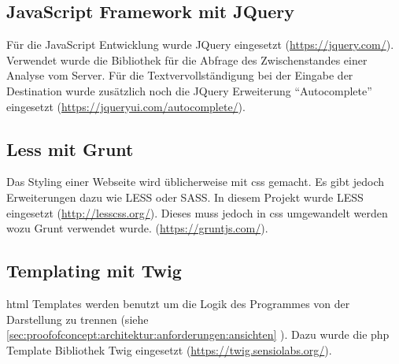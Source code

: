\subsection{JavaScript Framework mit JQuery}
Für die JavaScript Entwicklung wurde JQuery eingesetzt (\url{https://jquery.com/}). Verwendet wurde die Bibliothek für die Abfrage des Zwischenstandes einer Analyse vom Server. Für die Textvervollständigung bei der Eingabe der Destination wurde zusätzlich noch die JQuery Erweiterung "`Autocomplete"' eingesetzt (\url{https://jqueryui.com/autocomplete/}).

\subsection{Less mit Grunt}
Das Styling einer Webseite wird üblicherweise mit \gls{css} gemacht. Es gibt jedoch Erweiterungen dazu wie LESS oder SASS. In diesem Projekt wurde LESS eingesetzt (\url{http://lesscss.org/}). Dieses muss jedoch in \gls{css} umgewandelt werden wozu Grunt verwendet wurde. (\url{https://gruntjs.com/}).

\subsection{Templating mit Twig}
\label{sec:proofofconcept:externebibliotheken:twig}
\gls{html} Templates werden benutzt um die Logik des Programmes von der Darstellung zu trennen (siehe \cref{sec:proofofconcept:architektur:anforderungen:ansichten} ). Dazu wurde die \gls{php} Template Bibliothek Twig eingesetzt (\url{https://twig.sensiolabs.org/}).

